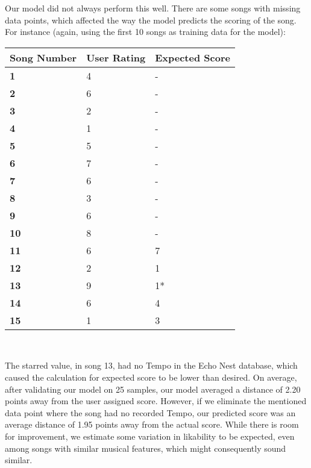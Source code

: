 \documentclass{amsart}
\theoremstyle{plain}
\theoremstyle{definition}
\begin{document}
  	Our model did not always perform this well. There are some songs with missing data points, which affected the way the model predicts the scoring of the song. For instance (again, using the first 10 songs as training data for the model): \\
  	
  	\begin{center}
  		\begin{tabular}{ | m{8em} | m{8em}| m{8em} | } 
  			\hline
  			\textbf{Song Number} & \textbf{User Rating} & \textbf{Expected Score} \\ 
  			\hline
  			\textbf{1} & 4 & - \\ 
  			\hline
  			\textbf{2} & 6 & - \\ 
  			\hline
  			\textbf{3} & 2 & - \\ 
  			\hline
  			\textbf{4} & 1 & - \\ 
  			\hline
  			\textbf{5} & 5 & - \\ 
  			\hline
  			\textbf{6} & 7 & - \\ 
  			\hline
  			\textbf{7} & 6 & - \\ 
  			\hline
  			\textbf{8} & 3 & - \\ 
  			\hline
  			\textbf{9} & 6 & - \\ 
  			\hline
  			\textbf{10} & 8 & - \\ 
  			\hline
  			\textbf{11} & 6 & 7 \\ 
  			\hline
  			\textbf{12} & 2 & 1 \\ 
  			\hline
  			\textbf{13} & 9 & 1* \\ 
  			\hline
  			\textbf{14} & 6 & 4 \\ 
  			\hline
  			\textbf{15} & 1 & 3 \\ 
  			\hline
  		\end{tabular}
  	\end{center} \
  
  	The starred value, in song 13, had no Tempo in the Echo Nest database, which caused the calculation for expected score to be lower than desired. On average, after validating our model on 25 samples, our model averaged a distance of 2.20 points away from the user assigned score. However, if we eliminate the mentioned data point where the song had no recorded Tempo, our predicted score was an average distance of 1.95 points away from the actual score. While there is room for improvement, we estimate some variation in likability to be expected, even among songs with similar musical features, which might consequently sound similar.
  	
\end{document}
